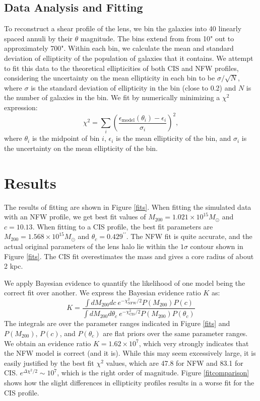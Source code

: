 \documentclass[10pt]{article}
\begin{document}
\subsection{Data Analysis and Fitting}
To reconstruct a shear profile of the lens, we bin the galaxies into 40 linearly spaced annuli by their $\theta$ magnitude. The bins extend from from 10" out to approximately 700". Within each bin, we calculate the mean and standard deviation of ellipticity of the population of galaxies that it contains. We attempt to fit this data to the theoretical ellipticities of both CIS and NFW profiles, considering the uncertainty on the mean ellipticity in each bin to be $\sigma / \sqrt{N}$, where $\sigma$ is the standard deviation of ellipticity in the bin (close to 0.2) and $N$ is the number of galaxies in the bin. We fit by numerically minimizing a $\chi^2$ expression:
\begin{equation}
\chi^2 = \sum_i{\left(\frac{\epsilon_\mathrm{model}(\theta_i) - \epsilon_i}{\sigma_i}\right)^2},
\end{equation}
where $\theta_i$ is the midpoint of bin $i$, $\epsilon_i$ is the mean ellipticity of the bin, and $\sigma_i$ is the uncertainty on the mean ellipticity of the bin.


\section{Results}
The results of fitting are shown in Figure \ref{fits}. When fitting the simulated data with an NFW profile, we  get best fit values of $M_{200} = 1.021 \times 10^{15} M_\odot$ and $c = 10.13$. When fitting to a CIS profile, the best fit parameters are $M_{200} = 1.568 \times 10^{15} M_\odot$ and $\theta_c = 0.429^{\prime \prime}$. The NFW fit is quite accurate, and the actual original parameters of the lens halo lie within the $1\sigma$ contour shown in Figure \ref{fits}. The CIS fit overestimates the mass and gives a core radius of about 2 kpc.

We apply Bayesian evidence to quantify the likelihood of one model being the correct fit over another. We express the Bayesian evidence ratio $K$ as:
\begin{equation}
K = \frac{\int dM_{200} dc\ e^{-\chi^2_\mathrm{NFW} / 2} P(M_{200}) P(c)}{\int dM_{200} d\theta_c\ e^{-\chi^2_\mathrm{CIS} / 2} P(M_{200}) P(\theta_c)}
\end{equation}
The integrals are over the parameter ranges indicated in Figure \ref{fits} and $P(M_{200})$, $P(c)$, and $P(\theta_c)$ are flat priors over the same parameter ranges. We obtain an evidence ratio $K = 1.62 \times 10^7$, which very strongly indicates that the NFW model is correct (and it is). While this may seem excessively large, it is easily justified by the best fit $\chi^2$ values, which are 47.8 for NFW and 83.1 for CIS. $e^{\Delta \chi^2 / 2} \sim 10^7$, which is the right order of magnitude. Figure \ref{fitcomparison} shows how the slight differences in ellipticity profiles results in a worse fit for the CIS profile.
\end{document}
